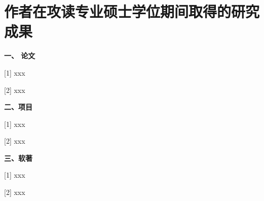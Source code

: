 
\section*{作者在攻读专业硕士学位期间取得的研究成果}


\noindent
\textbf{一、 论文}

[1] xxx

[2] xxx

\noindent
\textbf{二、项目}

[1] xxx

[2] xxx

\noindent	
\textbf{三、软著}

[1] xxx

[2] xxx



